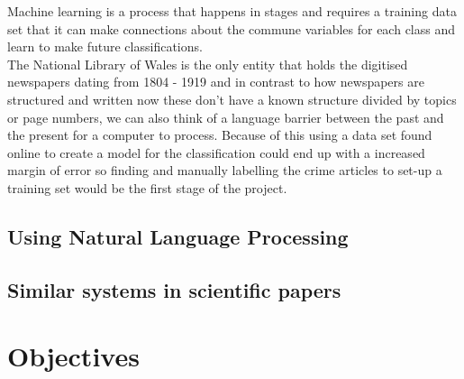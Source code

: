 \documentclass[a4paper, 12pt]{report}
\begin{document}
Machine learning is a process that happens in stages and requires a training data set that it can make connections about the commune variables for each class and learn to make future classifications.\\

The National Library of Wales is the only entity that holds the digitised newspapers dating from 1804 - 1919 and in contrast to how newspapers are structured and written now  these don't have a known structure divided by topics or page numbers, we can also think of a language barrier between the past and the present for a computer to process.  Because of this using a data set found online to create a model for the classification could end up with a increased margin of error so finding and manually labelling the crime articles to set-up a training set would be the first stage of the project.\\

\subsection{Using Natural Language Processing}
\subsection{Similar systems in scientific papers}


\section{Objectives}


{}

\end{document}
